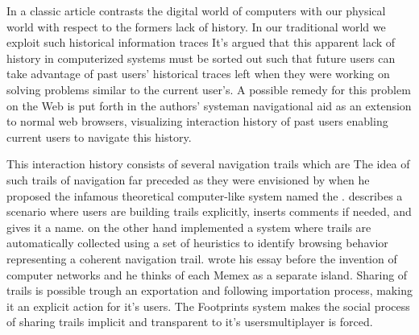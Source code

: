 In a classic article \citet{wexelblat99} contrasts the digital world of
computers with our physical world with respect to the formers lack of history.
In our traditional world we exploit such historical information traces
It's argued that this apparent lack of history in computerized systems must
be sorted out such that future users can take advantage
of past users' historical traces left when they were working
on solving problems similar to the current user's.
A possible remedy for this problem on the Web is put forth in the authors'
 system\dash{}an navigational aid as an extension to
normal web browsers, visualizing interaction history of past users enabling
current users to navigate this history.

This interaction history consists of several navigation trails which are
The idea of such trails of navigation far preceded \citeauthor{wexelblat99}
as they were envisioned by \citet{bush45} when he proposed the infamous
theoretical computer-like system named the %
.
\citeauthor{bush45} describes a scenario where users are building trails
explicitly, inserts comments if needed, and gives it a name.
\citeauthor{wexelblat99} on the other hand
implemented a system where trails are automatically collected using a set of
heuristics to identify browsing behavior representing a coherent navigation
trail.
\citeauthor{bush45} wrote his essay before the invention of computer networks
and he thinks of each Memex as a separate island. Sharing of trails is
possible trough an exportation and following importation process, making it an
explicit action for it's users.
The Footprints system makes the social process of sharing trails implicit and
transparent to it's users\dash{}multiplayer is forced.

